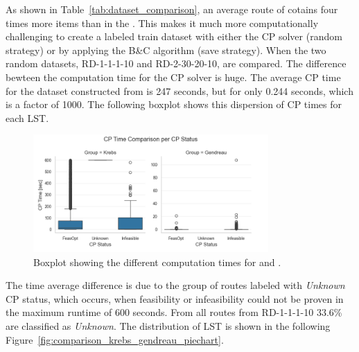 As shown in Table~\ref{tab:dataset_comparison}, an average route of \krebsADataSetText cotains four times more items than
in the \gendreauDataSet. This makes it much more computationally challenging to create a labeled train dataset with either
the \gls{CP} solver (random strategy) or by applying the B\&C algorithm (save strategy). When the two random datasets, RD-1-1-1-10
and RD-2-30-20-10, are compared. The difference bewteen the computation time for the \gls{CP} solver is huge. The average
\gls{CP} time for the dataset constructed from \krebsADataSetText is 247 seconds, but for \gendreauDataSetText only 0.244 seconds,
which is a factor of 1000. The following boxplot shows this dispersion of \gls{CP} times for each \gls{LST}.
\begin{figure}[ht]
    \centering
    \includegraphics[width=0.8\textwidth]{pictures/comparison_krebs_gendreau/boxplot_cp_time.png}
    \caption{Boxplot showing the different computation times for \krebsADataSetText and \gendreauDataSet.}
    \label{fig:comparison_krebs_gendreau_boxplot}
\end{figure}

The time average difference is due to the group of routes labeled with \textit{Unknown} \gls{CP} status, which occurs, when
feasibility or infeasibility could not be proven in the maximum runtime of 600 seconds. From all routes from RD-1-1-1-10
33.6\% are classified as \textit{Unknown}. The distribution of \gls{LST} is shown in the following Figure~\ref{fig:comparison_krebs_gendreau_piechart}.

